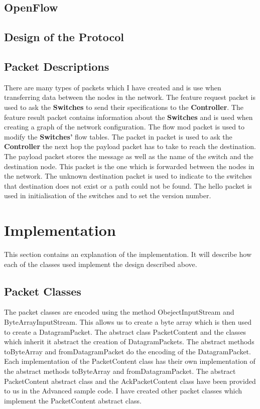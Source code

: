 \documentclass{article}
\begin{document}
\subsection{OpenFlow}

\subsection{Design of the Protocol}

\subsection{Packet Descriptions}
There are many types of packets which I have created and is use when
transferring data between the nodes in the network. The feature request packet
is used to ask the \textbf{Switches} to send their specifications to the
\textbf{Controller}. The feature result packet contains information about the
\textbf{Switches} and is used when creating a graph of the network
configuration. The flow mod packet is used to modify the \textbf{Switches'}
flow tables. The packet in packet is used to ask the \textbf{Controller} the
next hop the payload packet has to take to reach the destination. The payload
packet stores the message as well as the name of the switch and the destination
node. This packet is the one which is forwarded between the nodes in the
network. The unknown destination packet is used to indicate to the switches
that destination does not exist or a path could not be found. The hello packet
is used in initialisation of the switches and to set the version number.

\section{Implementation}
This section contains an explanation of the implementation. It will describe how
each of the classes used implement the design described above.

\subsection{Packet Classes}
The packet classes are encoded using the method ObejectInputStream and
ByteArrayInputStream. This allows us to create a byte array which is then used
to create a DatagramPacket. The abstract class PacketContent and the classes
which inherit it abstract the creation of DatagramPackets. The abstract
methods toByteArray and fromDatagramPacket do the encoding of the
DatagramPacket. Each implementation of the PacketContent class has their own
implementation of the abstract methods toByteArray and fromDatagramPacket. The
abstract PacketContent abstract class and the AckPacketContent class have been
provided to us in the Advanced sample code. I have created other packet classes
which implement the PacketContent abstract class.
\end{document}
